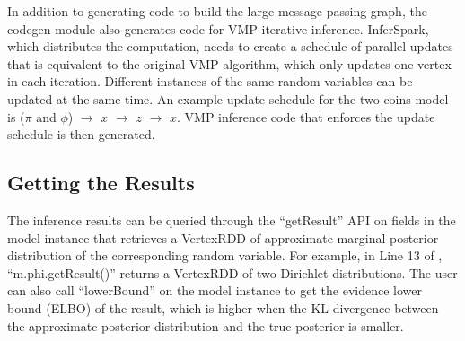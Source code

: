 
In addition to generating code to build the large message passing graph,
the codegen module also generates code for VMP iterative inference. 
InferSpark, which
distributes the computation, needs to create a schedule of parallel updates
that is equivalent to the original VMP algorithm, which only updates one vertex
in each iteration.  Different instances of the same random variables can be
updated at the same time. An example update schedule for the two-coins model is
($\pi$ and $\phi$) $\rightarrow$ $x$ $\rightarrow$ $z$ $\rightarrow$ $x$. VMP inference code that enforces the update
schedule is then generated. %

\subsection{Getting the Results}
The inference results can be queried through the ``{\sf getResult}''
API on fields in the model instance that retrieves a VertexRDD of approximate
marginal posterior distribution of the corresponding random variable. For
example, in Line 13 of , ``{\sf m.phi.getResult()}'' 
returns a VertexRDD of two Dirichlet distributions. 
The user can also call ``{\sf lowerBound}'' 
on the model instance to get the evidence lower bound (ELBO) of the result, 
which is higher when the KL divergence between the approximate posterior 
distribution and the true posterior is smaller. 

